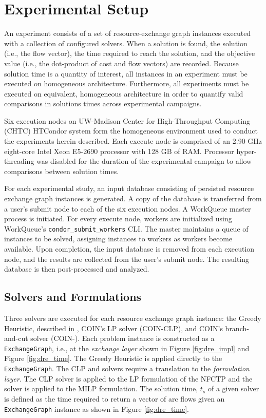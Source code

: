 
\section{Experimental Setup}\label{results:setup}

An experiment consists of a set of resource-exchange graph instances executed
with a collection of configured solvers. When a solution is found, the solution
(i.e., the flow vector), the time required to reach the solution, and the
objective value (i.e., the dot-product of cost and flow vectors) are
recorded. Because solution time is a quantity of interest, all instances in an
experiment must be executed on homogeneous architecture. Furthermore, all
experiments must be executed on equivalent, homogeneous architecture in order to
quantify valid comparisons in solutions times across experimental campaigns.

Six execution nodes on UW-Madison Center for High-Throughput Computing (CHTC)
HTCondor system form the homogeneous environment used to conduct the experiments
herein described. Each execute node is comprised of an 2.90 GHz eight-core Intel
Xeon E5-2690 \cite{intelproc} processor with 128 GB of RAM. Processor
hyper-threading was disabled for the duration of the experimental campaign to
allow comparisons between solution times.

For each experimental study, an input database consisting of persisted resource
exchange graph instances is generated. A copy of the database is transferred
from a user's submit node to each of the six execution nodes. A WorkQueue master
process is initiated. For every execute node, workers are initialized using
WorkQueue's \texttt{condor\_submit\_workers} CLI. The master maintains a queue
of instances to be solved, assigning instances to workers as workers become
available. Upon completion, the input database is removed from each execution
node, and the results are collected from the user's submit node. The resulting
database is then post-processed and analyzed.

\subsection{Solvers and Formulations}

Three solvers are executed for each resource exchange graph instance: the Greedy
Heuristic, described in , COIN's LP solver
(COIN-CLP), and COIN's branch-and-cut solver (COIN-\cbc). Each problem instance
is constructed as a \texttt{ExchangeGraph}, i.e., at the \textit{exchange layer}
shown in Figure \ref{fig:dre_impl} and Figure \ref{fig:dre_time}. The Greedy
Heuristic is applied directly to the \texttt{ExchangeGraph}. The CLP and \cbc
solvers require a translation to the \textit{formulation layer}. The CLP solver
is applied to the LP formulation of the NFCTP and the \cbc solver is applied to
the MILP formulation. The solution time, $t_s$ of a given solver is defined as
the time required to return a vector of arc flows given an
\texttt{ExchangeGraph} instance as shown in Figure \ref{fig:dre_time}.

